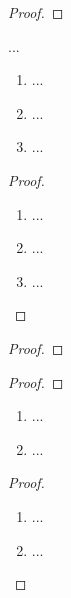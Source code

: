 \documentclass[12pt]{scrreprt}
\begin{document}
\begin{satz}\label{}

\end{satz}
\begin{proof}

\end{proof}

\begin{satz}\label{}
...
\begin{enumerate}
\item ...
\item ...
\item ...
\end{enumerate}
\end{satz}
\begin{proof}
\begin{enumerate}
\item ...
\item ...
\item ...
\end{enumerate}
\end{proof}

\begin{kor}\label{}

\end{kor}

\begin{satz}\label{}

\end{satz}
\begin{proof}

\end{proof}

\begin{satz}\label{}

\end{satz}
\begin{bem*}

\end{bem*}
\begin{proof}

\end{proof}

\begin{bsp}\label{}
\begin{enumerate}
\item ...
\item ...
\end{enumerate}
\end{bsp}

\begin{thm}\label{}

\end{thm}
\begin{proof}
\begin{enumerate}
\item ...
\item ...
\end{enumerate}
\end{proof}
\end{document}
